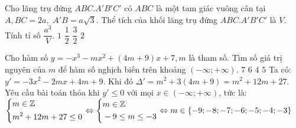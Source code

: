 \begin{ex}%
Cho lăng trụ đứng $ABC.A'B'C'$ có $ABC$ là một tam giác vuông cân tại $A, BC = 2a,$ $ A'B = a\sqrt{3}$. Thể tích của khối lăng trụ đứng $ABC.A'B'C'$ là $V$. Tính tỉ số $\dfrac{a^3}{V}$.
 \choice
  { \True $1$}
  { $\dfrac{1}{2}$}
  { $\dfrac{3}{2}$}
  { $2$}
 \loigiai
  {
  {
  }
  }
\end{ex}


\begin{ex}%
Cho hàm số $y = -x^3-mx^2+(4m+9)x+7, m$ là tham số. Tìm số giá trị nguyên của $m$ để hàm số nghịch biến trên khoảng $\left( -\infty; +\infty\right)$.
 \choice
  { \True $7$}
  { $6$}
  { $4$}
  { $5$}
 \loigiai
  {
  Ta có: $y' = -3x^2-2mx+4m+9$. Khi đó $\Delta' = m^2+3(4m+9)=m^2+12m+27$.\\
  Yêu cầu bài toán thỏa khi $y' \le 0$ với mọi $x \in \left( -\infty; +\infty\right)$, tức là:\\
  $\left\{\begin{aligned}& m \in \mathbb{Z} \\& m^2+12m+27 \le 0\end{aligned}\right. \Leftrightarrow \left\{\begin{aligned}& m \in \mathbb{Z} \\& -9 \le m \le -3\end{aligned}\right. \Leftrightarrow m \in \left\{-9;-8;-7;-6;-5;-4;-3\right\}$
  }
\end{ex}


